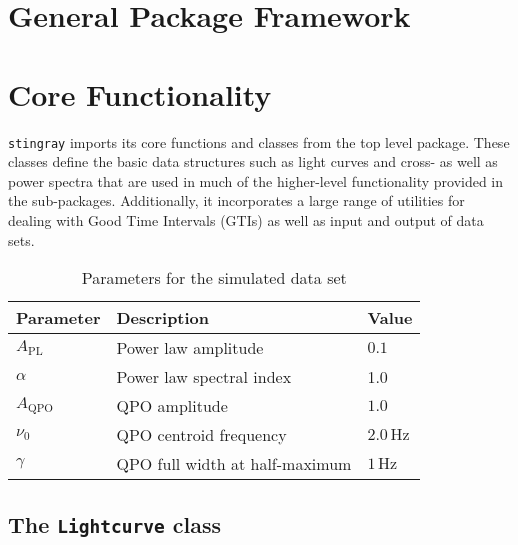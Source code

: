 \documentclass[12pt]{emulateapj}
\newcommand{\stingray}{\texttt{stingray}\xspace}
\begin{document}
\section{General Package Framework}
\label{sec:general_package}





\section{Core Functionality}
\label{sec:core}

\stingray imports its core functions and classes from the top level package. 
These classes define the basic data structures such as light curves and cross- as well as power spectra that are used in much of the higher-level functionality provided in the sub-packages. 
Additionally, it incorporates a large range of utilities for dealing with Good Time Intervals (GTIs) as well as input and output of data sets.


\begin{table}[hbtp]
\footnotesize
\caption{Parameters for the simulated data set}
\begin{threeparttable} 
\begin{tabularx}{8.5cm}{p{2.5cm}p{4.0cm}p{2.0cm}}
\toprule
\bf{Parameter} & \bf{Description} &\bf{Value} \\ \midrule
$A_{\mathrm{PL}}$ & Power law amplitude & $0.1$ \\
$\alpha$ & Power law spectral index & 1.0 \\
$A_{\mathrm{QPO}}$ & QPO amplitude &  $1.0$ \\
$\nu_0$ & QPO centroid frequency & $2.0 \,\mathrm{Hz}$ \\
$\gamma$ & QPO full width at half-maximum &$1 \,\mathrm{Hz}$ \\
 \bottomrule
\end{tabularx}
   \begin{tablenotes}
      \item{}
\end{tablenotes}
\end{threeparttable}
\label{table:parameters}
\end{table}

\subsection{The \texttt{Lightcurve} class}
\label{sec:lightcurve}
\end{document}
